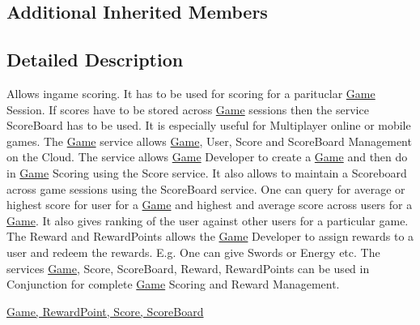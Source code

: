 \subsection*{Additional Inherited Members}


\subsection{Detailed Description}


Allows ingame scoring. It has to be used for scoring for a parituclar \hyperlink{classcom_1_1shephertz_1_1app42_1_1paas_1_1sdk_1_1windows_1_1game_1_1_game}{Game} Session. If scores have to be stored across \hyperlink{classcom_1_1shephertz_1_1app42_1_1paas_1_1sdk_1_1windows_1_1game_1_1_game}{Game} sessions then the service Score\+Board has to be used. It is especially useful for Multiplayer online or mobile games. The \hyperlink{classcom_1_1shephertz_1_1app42_1_1paas_1_1sdk_1_1windows_1_1game_1_1_game}{Game} service allows \hyperlink{classcom_1_1shephertz_1_1app42_1_1paas_1_1sdk_1_1windows_1_1game_1_1_game}{Game}, User, Score and Score\+Board Management on the Cloud. The service allows \hyperlink{classcom_1_1shephertz_1_1app42_1_1paas_1_1sdk_1_1windows_1_1game_1_1_game}{Game} Developer to create a \hyperlink{classcom_1_1shephertz_1_1app42_1_1paas_1_1sdk_1_1windows_1_1game_1_1_game}{Game} and then do in \hyperlink{classcom_1_1shephertz_1_1app42_1_1paas_1_1sdk_1_1windows_1_1game_1_1_game}{Game} Scoring using the Score service. It also allows to maintain a Scoreboard across game sessions using the Score\+Board service. One can query for average or highest score for user for a \hyperlink{classcom_1_1shephertz_1_1app42_1_1paas_1_1sdk_1_1windows_1_1game_1_1_game}{Game} and highest and average score across users for a \hyperlink{classcom_1_1shephertz_1_1app42_1_1paas_1_1sdk_1_1windows_1_1game_1_1_game}{Game}. It also gives ranking of the user against other users for a particular game. The Reward and Reward\+Points allows the \hyperlink{classcom_1_1shephertz_1_1app42_1_1paas_1_1sdk_1_1windows_1_1game_1_1_game}{Game} Developer to assign rewards to a user and redeem the rewards. E.\+g. One can give Swords or Energy etc. The services \hyperlink{classcom_1_1shephertz_1_1app42_1_1paas_1_1sdk_1_1windows_1_1game_1_1_game}{Game}, Score, Score\+Board, Reward, Reward\+Points can be used in Conjunction for complete \hyperlink{classcom_1_1shephertz_1_1app42_1_1paas_1_1sdk_1_1windows_1_1game_1_1_game}{Game} Scoring and Reward Management. 

\hyperlink{classcom_1_1shephertz_1_1app42_1_1paas_1_1sdk_1_1windows_1_1game_1_1_score_service}{Game, Reward\+Point, Score, Score\+Board} 


